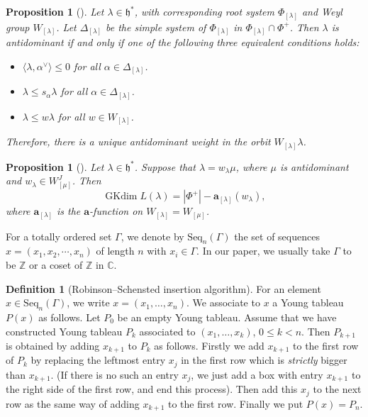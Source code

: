 \documentclass[reqno,12pt]{amsart}
\numberwithin{equation}{section}
\theoremstyle{plain}
\newtheorem{Prop}[Thm]{Proposition}
\theoremstyle{definition}
\newtheorem{Defff}[Thm]{Definition}
\newcommand{\lam}{\lambda}
\newcommand{\hs}{ \mathfrak{h}^*}
\newcommand{\aff}{ \mathbf{a} }
\newcommand{\gkd}{\operatorname{GKdim}}
\newcommand{\lest}{\leqslant}
\renewcommand{\leq}{\leqslant}
\begin{document}
\begin{Prop}[{\cite[Prop. 3.5]{Hum08}}]\label{anti}
    Let $\lambda\in \mathfrak{h}^*$, with corresponding root system $\Phi_{[\lambda]}$ and Weyl group $W_{[\lambda]}$. Let $\Delta_{[\lambda]}$ be the simple system of  $\Phi_{[\lambda]}$ in $\Phi_{[\lambda]} \cap \Phi^+$.  Then $\lambda$ is antidominant if and only if one of the
following three equivalent conditions holds:
\begin{itemize}
    \item[(1)] $\langle\lambda, \alpha^\vee\rangle\lest 0$ for all $\alpha \in \Delta_{[\lambda]}$.
    \item[(2)] $\lambda\lest s_{\alpha}\lambda$ for all $\alpha \in \Delta_{[\lambda]}$.
    \item[(3)]  $\lambda\lest w\lambda$ for all $w \in W_{[\lambda]}$.
\end{itemize}
Therefore, there is a unique antidominant weight in the orbit $W_{[\lambda]}\lambda$.
\end{Prop}

\begin{Prop}[{\cite[Prop. 3.8]{BX}}]\label{pr:main1}
	Let $ \lam\in\hs $. Suppose that $\lambda=w_{\lambda}\mu$, where $\mu$ is antidominant and $w_{\lambda}\in W_{[\mu]}^J$. Then
\begin{equation*}
	\gkd L(\lambda)=|\Phi^+|-\aff_{[\lambda]}(w_{\lambda}),
\end{equation*}
	where $\aff_{[\lambda]}$ is the $\aff$-function on $W_{[\lambda]}=W_{[\mu]}$.
\end{Prop}


For  a totally ordered set $ \Gamma $, we  denote by $ \mathrm{Seq}_n (\Gamma)$ the set of sequences $ x=(x_1,x_2,\cdots, x_n) $   of length $ n $ with $ x_i\in\Gamma $. In our paper, we usually take $\Gamma$ to be $\mathbb{Z}$ or a coset of $\mathbb{Z}$ in $\mathbb{C}$.
 \begin{Defff}[Robinson--Schensted insertion algorithm]
For an element  $ x \in  \mathrm{Seq}_n (\Gamma)$, we write  $x=(x_1,\dots,x_n)$. We associate to $x $ a  Young tableau  $ P(x) $ as follows. Let $ P_0 $ be an empty Young tableau. Assume that we have constructed Young tableau $ P_k $ associated to $ (x_1,\dots,x_k) $, $ 0\leq k<n $. Then $ P_{k+1} $ is obtained by adding $ x_{k+1} $ to $ P_k $ as follows. Firstly we add $ x_{k+1} $ to the first row of $ P_k $ by replacing the leftmost entry $ x_j $ in the first row which is \textit{strictly} bigger than $ x_{k+1} $.  (If there is no such an entry $ x_j $, we just add a box with entry $x_{k+1}  $ to the right side of the first row, and end this process). Then add this $ x_j $ to the next row as the same way of adding $x_{k+1} $ to the first row.  Finally we put $P(x)=P_n$.

\end{Defff}
\end{document}

